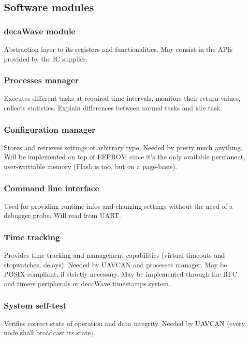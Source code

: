\subsection{Software modules}



\subsubsection{decaWave module}
Abstraction layer to its registers and functionalities.
May consist in the APIs provided by the IC supplier.

\subsubsection{Processes manager}
Executes different tasks at required time intervals, monitors their return values, collects statistics.
Explain differences between normal tasks and idle task.

\subsubsection{Configuration manager}
Stores and retrieves settings of arbitrary type.
Needed by pretty much anything.
Will be implemented on top of EEPROM since it's the only available permanent, user-writtable memory (Flash is too, but on a page-basis).

\subsubsection{Command line interface}
Used for providing runtime infos and changing settings without the need of a debugger probe.
Will read from UART.

\subsubsection{Time tracking}
Provides time tracking and management capabilities (virtual timeouts and stopwatches, delays).
Needed by UAVCAN and processes manager.
May be POSIX-compliant, if strictly necessary.
May be implemented through the RTC and timers peripherals or decaWave timestamps system.

\subsubsection{System self-test}
Verifies correct state of operation and data integrity.
Needed by UAVCAN (every node shall broadcast its state).

